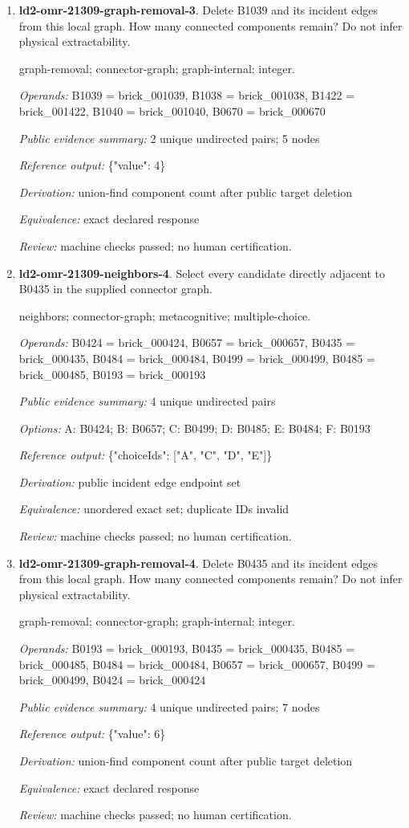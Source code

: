 \begin{enumerate}
\item \textbf{ld2-omr-21309-graph-removal-3}. Delete B1039 and its incident edges from this local graph. How many connected components remain? Do not infer physical extractability.
\par{\small graph-removal; connector-graph; graph-internal; integer.\par\textit{Operands:} B1039 = brick\_001039, B1038 = brick\_001038, B1422 = brick\_001422, B1040 = brick\_001040, B0670 = brick\_000670\par\textit{Public evidence summary:} 2 unique undirected pairs; 5 nodes\par\textit{Reference output:} \{"value": 4\}\par\textit{Derivation:} union-find component count after public target deletion\par\textit{Equivalence:} exact declared response\par\textit{Review:} machine checks passed; no human certification.}
\item \textbf{ld2-omr-21309-neighbors-4}. Select every candidate directly adjacent to B0435 in the supplied connector graph.
\par{\small neighbors; connector-graph; metacognitive; multiple-choice.\par\textit{Operands:} B0424 = brick\_000424, B0657 = brick\_000657, B0435 = brick\_000435, B0484 = brick\_000484, B0499 = brick\_000499, B0485 = brick\_000485, B0193 = brick\_000193\par\textit{Public evidence summary:} 4 unique undirected pairs\par\textit{Options:} A: B0424; B: B0657; C: B0499; D: B0485; E: B0484; F: B0193\par\textit{Reference output:} \{"choiceIds": ["A", "C", "D", "E"]\}\par\textit{Derivation:} public incident edge endpoint set\par\textit{Equivalence:} unordered exact set; duplicate IDs invalid\par\textit{Review:} machine checks passed; no human certification.}
\item \textbf{ld2-omr-21309-graph-removal-4}. Delete B0435 and its incident edges from this local graph. How many connected components remain? Do not infer physical extractability.
\par{\small graph-removal; connector-graph; graph-internal; integer.\par\textit{Operands:} B0193 = brick\_000193, B0435 = brick\_000435, B0485 = brick\_000485, B0484 = brick\_000484, B0657 = brick\_000657, B0499 = brick\_000499, B0424 = brick\_000424\par\textit{Public evidence summary:} 4 unique undirected pairs; 7 nodes\par\textit{Reference output:} \{"value": 6\}\par\textit{Derivation:} union-find component count after public target deletion\par\textit{Equivalence:} exact declared response\par\textit{Review:} machine checks passed; no human certification.}

\end{enumerate}
